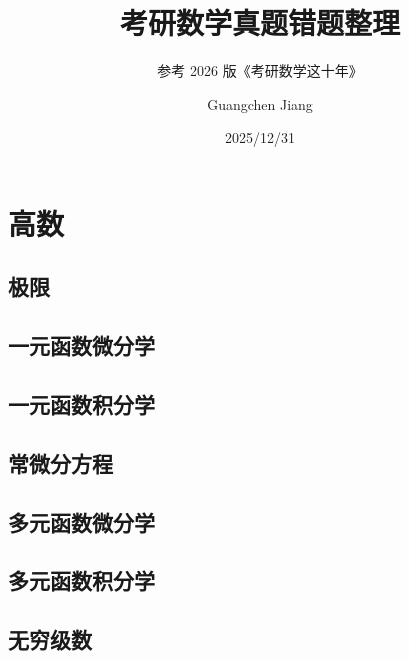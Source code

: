 \documentclass[lang=cn,math=mtpro2,11pt,scheme=chinese]{elegantbook}
\title{考研数学真题错题整理}
\subtitle{参考 2026 版《考研数学这十年》}
\author{Guangchen Jiang}
\date{2025/12/31}
\begin{document}
\maketitle
\frontmatter

\tableofcontents

\mainmatter

\chapter{高数}

\section{极限}

\vspace{2em}

\section{一元函数微分学}

\vspace{2em}

\section{一元函数积分学}


\section{常微分方程}



\section{多元函数微分学}



\section{多元函数积分学}



\section{无穷级数}


\end{document}
